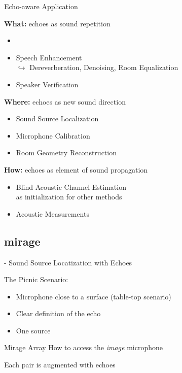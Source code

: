 \begin{frame}{Echo-aware Application}
    \begin{block}{\textbf{What:} echoes as sound repetition}
        \begin{itemize}
            \item
            \item Speech Enhancement
            \\$\hookrightarrow$ Dereverberation, Denoising, Room Equalization
            \item Speaker Verification
        \end{itemize}
    \end{block}
    \begin{block}{\textbf{Where:} echoes as new sound direction}
        \begin{itemize}
            \item Sound Source Localization
            \item Microphone Calibration
            \item Room Geometry Reconstruction
        \end{itemize}
    \end{block}
    \begin{block}{\textbf{How:} echoes as element of sound propagation}
        \begin{itemize}
            \item Blind Acoustic Channel Estimation
            \\as initialization for other methods
            \item Acoustic Measurements
        \end{itemize}
    \end{block}
\end{frame}

\subsection{mirage}

\begin{frame}{\mirage - Sound Source Locatization with Echoes}
    \begin{block}{The \alert{Picnic} Scenario:}
        \begin{itemize}
            \item Microphone close to a surface (table-top scenario)
            \item Clear definition of the echo
            \item One source
        \end{itemize}
    \end{block}

    \begin{block}{Mirage Array}
        How to access the \textit{image} microphone
    \end{block}

    Each pair is augmented with echoes

\end{frame}

